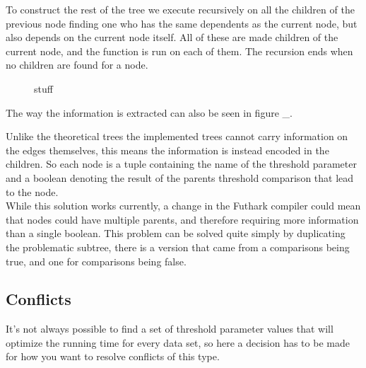 To construct the rest of the tree we execute recursively on all the children
of the previous node finding one who has the same dependents as the current
node, but also depends on the current node itself. All of these are made
children of the current node, and the function is run on each of them. The
recursion ends when no children are found for a node.
\begin{figure}
	\centering
	
	\caption{stuff}
\end{figure}


The way the information is extracted can also be seen in figure \_. 

Unlike the theoretical trees the implemented trees cannot carry information on
the edges themselves, this means the information is instead encoded in the
children. So each node is a tuple containing the name of the threshold
parameter and a boolean denoting the result of the parents threshold
comparison that lead to the node.\\
While this solution works currently, a change in the Futhark compiler could
mean that nodes could have multiple parents, and therefore requiring more
information than a single boolean. This problem can be solved quite simply by
duplicating the problematic subtree, there is a version that came from a
comparisons being true, and one for comparisons being false.



\subsection{Conflicts}
It's not always possible to find a set of threshold parameter values that will
optimize the running time for every data set, so here a decision has to be made
for how you want to resolve conflicts of this type.
